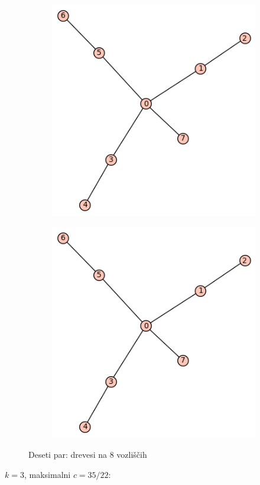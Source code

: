 \documentclass[12pt, a4paper]{article}
\begin{document}
\begin{figure}[!htb]
\centering
\begin{subfigure}{0.5\textwidth}
  \centering
  \includegraphics[width=0.5\linewidth]{t-44}
\end{subfigure}%
\begin{subfigure}{0.5\textwidth}
  \centering
  \includegraphics[width=0.5\linewidth]{t-44}
\end{subfigure}
\caption{Deseti par: drevesi na 8 vozliščih}
\label{fig:test}
\end{figure}
\clearpage

$k=3$, maksimalni $c=35/22$:\\
\end{document}
